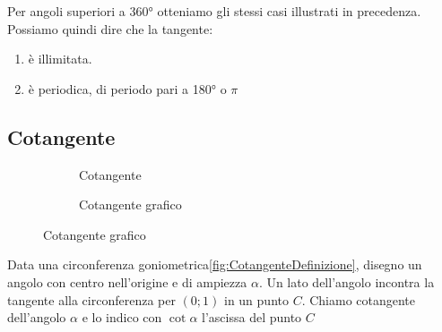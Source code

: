 Per angoli superiori a \ang{360} otteniamo gli stessi casi illustrati in precedenza. 
Possiamo quindi dire che la tangente:
\begin{enumerate}
	\item è illimitata.
	\item è periodica, di periodo pari a \ang{180} o $\pi$
\end{enumerate} 
\begin{figure}
	\centering

	\label{fig:AndamentoTangente1}
\end{figure}%
\begin{figure}
	\centering
	
\label{fig:AndamentoTangente2}
\end{figure}%
\subsection{Cotangente}
\label{sec:Cotangente}
\begin{figure}
	\begin{subfigure}[b]{.5\linewidth}
		\centering
		
	\caption{Cotangente}\label{fig:CotangenteDefinizione}
	\end{subfigure}%
	\begin{subfigure}[b]{.5\linewidth}
		\centering
		\caption{Cotangente grafico}\label{fig:CotangenteGrafico}
	\end{subfigure}
	\label{tab:funzcotg}
\end{figure}
%		
\begin{definizione}[Cotangente]
	Data una circonferenza goniometrica\nobs\vref{fig:CotangenteDefinizione}, disegno un angolo con centro nell'origine e di ampiezza $\alpha$. Un lato dell'angolo incontra la tangente  alla circonferenza  per $(0;1)$ in un punto $C$.  Chiamo cotangente dell'angolo $\alpha$ e lo indico con $\cot\alpha$ l'ascissa  del punto $C$
\end{definizione}

